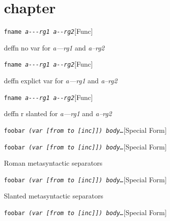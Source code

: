 \documentclass{book}
\begin{document}
\label{anchor:Top}%
\chapter{chapter}
\label{anchor:chapter}%

\noindent\texttt{fname \EmbracOn{}\textsl{a{-}{-}{-}rg1 a{-}{-}rg2}}\hfill[Func]



%
deffn no var for \textsl{a---rg1} and \textsl{a--rg2}

\noindent\texttt{fname \EmbracOn{}\textsl{\EmbracOff{}\textsl{a{-}{-}{-}rg1}\EmbracOn{} \EmbracOff{}\textsl{a{-}{-}rg2}\EmbracOn{}}}\hfill[Func]



%
deffn explict var for \textsl{a---rg1} and \textsl{a--rg2}

\noindent\texttt{fname \EmbracOn{}\textsl{\EmbracOff{}\textnormal{\textsl{a{-}{-}{-}rg1}}\EmbracOn{} \EmbracOff{}\textnormal{\textsl{a{-}{-}rg2}}\EmbracOn{}}}\hfill[Func]



%
deffn r slanted for \textsl{a---rg1} and \textsl{a--rg2}

\noindent\texttt{foobar \EmbracOn{}\textsl{(var [from to [inc]]) body\dots{}\@}}\hfill[Special Form]



%

\noindent\texttt{foobar \EmbracOn{}\textsl{(var \EmbracOff{}\textnormal{[}\EmbracOn{}from to \EmbracOff{}\textnormal{[}\EmbracOn{}inc\EmbracOff{}\textnormal{]]}\EmbracOn{}) body\dots{}\@}}\hfill[Special Form]



%
Roman metasyntactic separators

\noindent\texttt{foobar \EmbracOn{}\textsl{(var \EmbracOff{}\textsl{[}\EmbracOn{}from to \EmbracOff{}\textsl{[}\EmbracOn{}inc\EmbracOff{}\textsl{]]}\EmbracOn{}) body\dots{}\@}}\hfill[Special Form]



%
Slanted metasyntactic separators

\noindent\texttt{foobar \EmbracOn{}\textsl{(var \EmbracOff{}\textnormal{\textsl{[}}\EmbracOn{}from to \EmbracOff{}\textnormal{\textsl{[}}\EmbracOn{}inc\EmbracOff{}\textnormal{\textsl{]]}}\EmbracOn{}) body\dots{}\@}}\hfill[Special Form]
\end{document}
